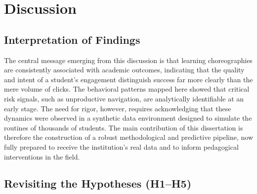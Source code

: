 \chapter{Discussion}
\label{chap:discussion}


\section{Interpretation of Findings}
\label{sec:interpretation}
The central message emerging from this discussion is that learning choreographies are consistently associated with academic outcomes, indicating that the quality and intent of a student's engagement distinguish success far more clearly than the mere volume of clicks. The behavioral patterns mapped here showed that critical risk signals, such as unproductive navigation, are analytically identifiable at an early stage. The need for rigor, however, requires acknowledging that these dynamics were observed in a synthetic data environment designed to simulate the routines of thousands of students. The main contribution of this dissertation is therefore the construction of a robust methodological and predictive pipeline, now fully prepared to receive the institution's real data and to inform pedagogical interventions in the field.

\section{Revisiting the Hypotheses (H1--H5)}
\label{sec:hypotheses-revisited}

